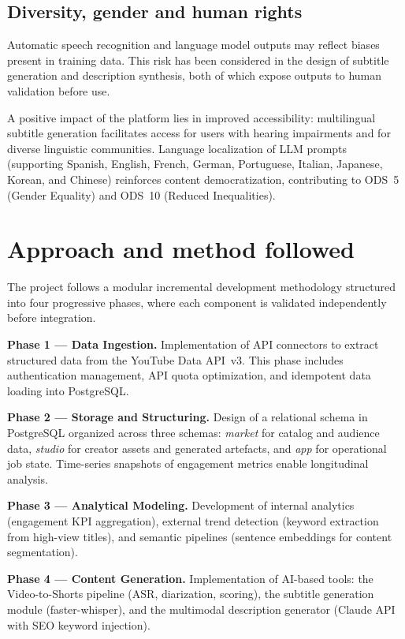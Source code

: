 \documentclass[ENG]{TFUOC}
\begin{document}
\subsection*{Diversity, gender and human rights}

Automatic speech recognition and language model outputs may reflect biases present in training data. This risk has been considered in the design of subtitle generation and description synthesis, both of which expose outputs to human validation before use.

A positive impact of the platform lies in improved accessibility: multilingual subtitle generation facilitates access for users with hearing impairments and for diverse linguistic communities. Language localization of LLM prompts (supporting Spanish, English, French, German, Portuguese, Italian, Japanese, Korean, and Chinese) reinforces content democratization, contributing to ODS~5 (Gender Equality) and ODS~10 (Reduced Inequalities).

\section{Approach and method followed}

The project follows a modular incremental development methodology structured into four progressive phases, where each component is validated independently before integration.

\textbf{Phase 1 — Data Ingestion.} Implementation of API connectors to extract structured data from the YouTube Data API~v3. This phase includes authentication management, API quota optimization, and idempotent data loading into PostgreSQL.

\textbf{Phase 2 — Storage and Structuring.} Design of a relational schema in PostgreSQL organized across three schemas: \textit{market} for catalog and audience data, \textit{studio} for creator assets and generated artefacts, and \textit{app} for operational job state. Time-series snapshots of engagement metrics enable longitudinal analysis.

\textbf{Phase 3 — Analytical Modeling.} Development of internal analytics (engagement KPI aggregation), external trend detection (keyword extraction from high-view titles), and semantic pipelines (sentence embeddings for content segmentation).

\textbf{Phase 4 — Content Generation.} Implementation of AI-based tools: the Video-to-Shorts pipeline (ASR, diarization, scoring), the subtitle generation module (faster-whisper), and the multimodal description generator (Claude API with SEO keyword injection).
\end{document}
